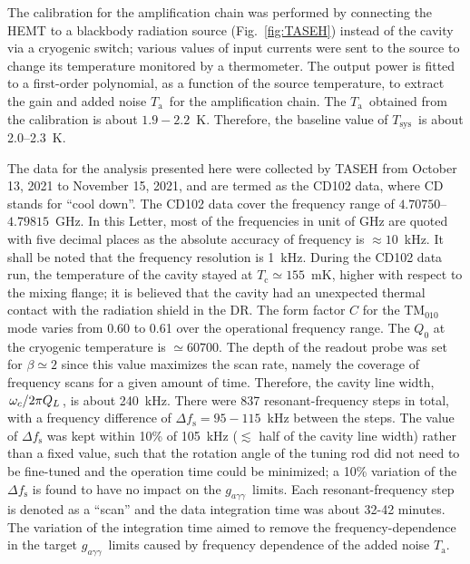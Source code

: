 \documentclass[%
 reprint,prl, %
superscriptaddress,
nobibnotes,
 amsmath,amssymb,
 aps,
]{revtex4-2}
\newcommand{\bgagg}{\ensuremath{g_{a\gamma\gamma}}}
\newcommand{\tsys}{\ensuremath{T_\text{sys}}}
\newcommand{\ta}{\ensuremath{T_\text{a}}}
\newcommand{\flo}{\ensuremath{4.70750}}
\newcommand{\fhi}{\ensuremath{4.79815}}
\newcommand{\noise}{\ensuremath{1.9 - 2.2}}
\begin{document}
The calibration for the amplification chain was performed by 
connecting the HEMT to a blackbody radiation source (Fig.~\ref{fig:TASEH}) 
instead of the cavity via a cryogenic switch; 
various values of input currents were sent to the 
source to change its temperature monitored by a thermometer. 
The output power is fitted to a first-order polynomial, as a function of
the source temperature, to extract the gain and added noise \ta\ for the
amplification chain. The \ta\ obtained from the calibration is 
about \noise~K. Therefore, the baseline value of \tsys\ is about 2.0--2.3~K. 


The data for the analysis presented here were collected by TASEH 
from October 13, 2021 to November 15, 2021, and are termed as the CD102 data, 
where CD stands for ``cool down''. 
The CD102 data cover the frequency range of \flo--\fhi~GHz. In this Letter, 
most of the frequencies in unit of GHz are quoted with five decimal places as the 
absolute accuracy of frequency is $\approx 10$~kHz. It shall be noted that the 
frequency resolution is 1~kHz.  
During the CD102 data run, 
the temperature of the cavity stayed at $T_\text{c}\simeq155$~mK, higher 
with respect to the mixing flange; it is believed that the cavity had an 
unexpected thermal contact with the radiation shield in the DR. 
The form factor $C$ for 
the TM$_{010}$ mode varies from 0.60 to 0.61 over the operational 
frequency range. 
The $Q_0$ at the cryogenic temperature is $\simeq 60700$. 
The depth of the readout probe was set for 
$\beta\simeq2$ since this value maximizes the scan rate, namely the coverage 
of frequency scans for a given amount of time. Therefore, 
the cavity line width, $\left.\omega_c\middle/2\pi Q_L\right.$, is about 
240~kHz. 
There were 837 resonant-frequency steps in total, with a frequency difference 
of $\Delta f_\text{s}=95-115$~kHz between the steps. The value of 
$\Delta f_\text{s}$ was kept within 10\% of 105~kHz ($\lesssim$ half of the 
cavity line width) rather than 
a fixed value, such that the rotation angle of the tuning rod did not need to 
be fine-tuned and the operation time could be minimized; a 10\% variation of 
the $\Delta f_\text{s}$ is found to have no impact on the \bgagg\ limits. 
Each resonant-frequency step is denoted as a ``scan'' 
and the data integration time was about 32-42 minutes. %
The variation of the integration 
time aimed to remove the frequency-dependence in the target \bgagg\ limits 
caused by frequency dependence of the added noise \ta. 
\end{document}
